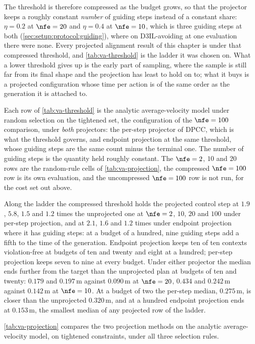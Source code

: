 The threshold is therefore compressed as the budget grows, so that the projector keeps a roughly constant
\emph{number} of guiding steps instead of a constant share: $\eta=0.2$ at $\nfe=20$ and $\eta=0.4$ at
$\nfe=10$, which is three guiding steps at both (\autoref{sec:setup:protocol:guiding}), where on
D3IL-avoiding at one evaluation there were none. Every projected alignment result of this chapter is under
that compressed threshold, and \autoref{tab:va-threshold} is the ladder it was chosen on. What a lower threshold gives up is the early part of sampling, where the sample is still
far from its final shape and the projection has least to hold on to; what it buys is a projected
configuration whose time per action is of the same order as the generation it is attached to.

Each row of \autoref{tab:va-threshold} is the analytic average-velocity model under random selection on
the tightened set, the configuration of the $\nfe=100$ comparison, under \emph{both} projectors: the
per-step projector of \ac{DPCC}, which is what the threshold governs, and endpoint projection at the same
threshold, whose guiding steps are the same count minus the terminal one. The number of guiding steps is
the quantity held roughly constant. The $\nfe=2$, $10$ and $20$ rows are the random-rule cells of
\autoref{tab:va-projection}, the compressed $\nfe=100$ row is its own evaluation, and the uncompressed
$\nfe=100$ row is not run, for the cost set out above.

Along the ladder the compressed threshold holds the projected control step at $1.9$, $5.8$, $1.5$ and
$1.2$ times the unprojected one at $\nfe=2$, $10$, $20$ and $100$ under per-step projection, and at $2.1$,
$1.6$ and $1.2$ times under endpoint projection where it has guiding steps: at a budget of a hundred,
nine guiding steps add a fifth to the time of the generation. Endpoint projection keeps ten of ten contexts
violation-free at budgets of ten and twenty and eight at a hundred; per-step projection keeps seven to nine at
every budget. Under either projector the median ends further from the target than the unprojected plan at
budgets of ten and twenty: $0.179$ and $0.197$\,m against $0.090$\,m at $\nfe=20$, $0.434$ and $0.242$\,m
against $0.142$\,m at $\nfe=10$. At a budget of two the per-step median, $0.275$\,m, is closer than the
unprojected $0.320$\,m, and at a hundred endpoint projection ends at $0.153$\,m, the smallest median of any
projected row of the ladder.

\autoref{tab:va-projection} compares the two projection methods on the analytic average-velocity model,
on tightened constraints, under all three selection rules.

